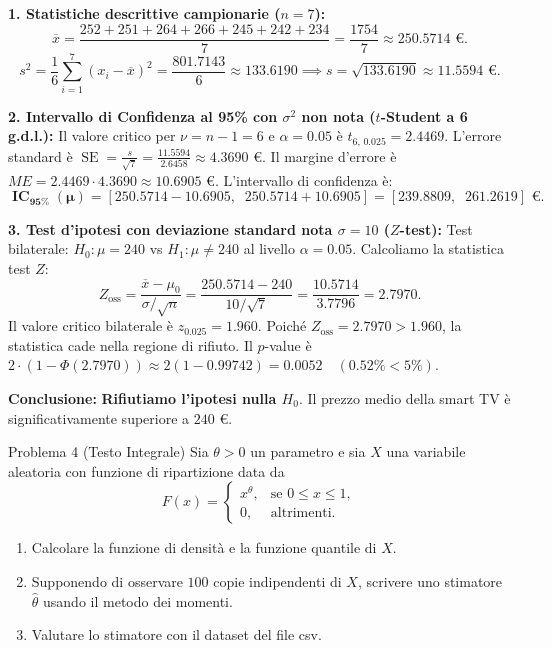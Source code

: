 \documentclass[11pt,a4paper]{article}
\begin{document}
\begin{soluzionebox}
\textbf{1. Statistiche descrittive campionarie ($n = 7$):}
\[
\overline{x} = \frac{252 + 251 + 264 + 266 + 245 + 242 + 234}{7} = \frac{1754}{7} \approx \bm{250.5714\text{ €}}.
\]
\[
s^2 = \frac{1}{6} \sum_{i=1}^7 (x_i - \overline{x})^2 = \frac{801.7143}{6} \approx 133.6190 \implies s = \sqrt{133.6190} \approx \bm{11.5594\text{ €}}.
\]

\textbf{2. Intervallo di Confidenza al 95\% con $\sigma^2$ non nota ($t$-Student a 6 g.d.l.):}
Il valore critico per $\nu = n-1 = 6$ e $\alpha = 0.05$ è $t_{6, \, 0.025} = 2.4469$.
L'errore standard è $\operatorname{SE} = \frac{s}{\sqrt{7}} = \frac{11.5594}{2.6458} \approx 4.3690\text{ €}$.
Il margine d'errore è $ME = 2.4469 \cdot 4.3690 \approx 10.6905\text{ €}$. L'intervallo di confidenza è:
\[
\mathbf{\operatorname{IC}_{95\%}(\mu) = [250.5714 - 10.6905, \;\; 250.5714 + 10.6905] = [239.8809, \;\; 261.2619]\text{ €}}.
\]

\textbf{3. Test d'ipotesi con deviazione standard nota $\sigma = 10$ ($Z$-test):}
Test bilaterale: $H_0: \mu = 240$ vs $H_1: \mu \neq 240$ al livello $\alpha = 0.05$.
Calcoliamo la statistica test $Z$:
\[
Z_{\text{oss}} = \frac{\overline{x} - \mu_0}{\sigma/\sqrt{n}} = \frac{250.5714 - 240}{10/\sqrt{7}} = \frac{10.5714}{3.7796} = \bm{2.7970}.
\]
Il valore critico bilaterale è $z_{0.025} = 1.960$.
Poiché $Z_{\text{oss}} = 2.7970 > 1.960$, la statistica cade nella regione di rifiuto.
Il $p$-value è $2 \cdot (1 - \Phi(2.7970)) \approx 2(1 - 0.99742) = \bm{0.0052} \quad (\bm{0.52\%} < 5\%)$.

\textbf{Conclusione:} \textbf{Rifiutiamo l'ipotesi nulla $H_0$}. Il prezzo medio della smart TV è significativamente superiore a $240\text{ €}$.
\end{soluzionebox}

\begin{problemabox}{Problema 4 (Testo Integrale)}
Sia $\theta>0$ un parametro e sia $X$ una variabile aleatoria con funzione di ripartizione data da
\[
F(x) = \begin{cases}
x^\theta, & \text{se } 0 \le x \le 1, \\
0, & \text{altrimenti.}
\end{cases}
\]
\begin{enumerate}
    \item Calcolare la funzione di densità e la funzione quantile di $X$.
    \item Supponendo di osservare $100$ copie indipendenti di $X$, scrivere uno stimatore $\widehat{\theta}$ usando il metodo dei momenti.
    \item Valutare lo stimatore con il dataset del file csv.
\end{enumerate}
\end{problemabox}
\end{document}
